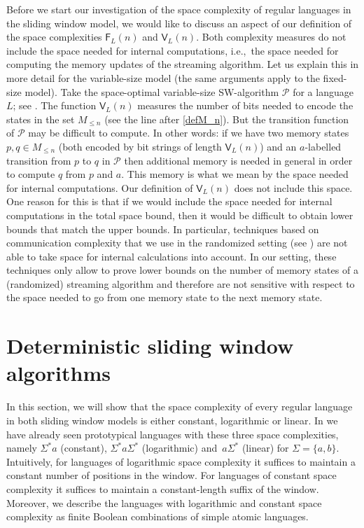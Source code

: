 \documentclass{article}\usepackage[a4paper,margin=20mm]{geometry}
\renewcommand{\P}{\mathcal{P}}
\newcommand{\F}{\mathsf{F}}
\newcommand{\V}{\mathsf{V}}
\renewcommand{\leq}{\leqslant}
\renewcommand{\le}{\leq}
\begin{document}
\begin{remark} \label{ref:internal comp}
Before we start our investigation of the space complexity of regular languages in the sliding window model, we would like to discuss 
an aspect of our definition of the space complexities $\F_L(n)$ and $\V_L(n)$. Both complexity measures do not 
include the space needed for internal computations, i.e.,~the space needed for computing the memory updates of the streaming algorithm. 
Let us explain this in more detail for the variable-size model (the same arguments apply to the fixed-size model). Take
the space-optimal variable-size SW-algorithm $\P$ for a language $L$; see .
The function $\V_L(n)$ measures the number of bits needed to encode the states in the set $M_{\le n}$ (see the line after \eqref{defM_n}).
But the transition function of $\P$ may be difficult to compute. In other words: if we have two memory states $p,q \in M_{\le n}$ 
(both encoded by bit strings of length $\V_L(n)$)
and an $a$-labelled transition from $p$ to $q$ in $\P$
 then additional memory is needed in general in order to compute $q$ from $p$ and $a$.
 This memory is what we mean by the space needed for internal computations. Our definition of $\V_L(n)$ does
 not include this space. One reason for this is that if we would include the space needed for internal computations
 in the total space bound, then it would be difficult to obtain lower bounds that match the upper bounds.
 In particular, techniques based
on communication complexity that we use in the randomized setting (see ) are not able to
take space for internal calculations into account. In our setting,
these techniques only allow to prove lower bounds on the number of memory states of a 
(randomized) streaming algorithm and therefore are not sensitive with respect to the space needed to 
go from one memory state to the next memory state.
\end{remark}


\section{Deterministic sliding window algorithms}

\label{chp:reg}

In this section, we will show that the space complexity of every regular language
in both sliding window models is either constant, logarithmic or linear.
In  we have already seen prototypical languages with these three space complexities,
namely $\Sigma^*a$ (constant), $\Sigma^*a\Sigma^*$ (logarithmic) and~$a\Sigma^*$ (linear) for $\Sigma = \{a,b\}$.
Intuitively, for languages of logarithmic space complexity it suffices to maintain a constant number
of positions in the window.
For languages of constant space complexity it suffices to maintain a constant-length suffix of the window.
Moreover, we describe the languages with logarithmic and constant space complexity
as finite Boolean combinations of simple atomic languages.
\end{document}
